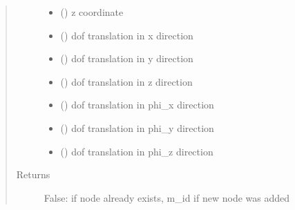 \documentclass[letterpaper,10pt,english]{sphinxmanual}
\begin{document}
\begin{fulllineitems}
\begin{fulllineitems}
\begin{quote}
\begin{description}
\begin{itemize}
\item {} 
 () \textendash{} z coordinate

\item {} 
 () \textendash{} dof translation in x direction

\item {} 
 () \textendash{} dof translation in y direction

\item {} 
 () \textendash{} dof translation in z direction

\item {} 
 () \textendash{} dof translation in phi\_x direction

\item {} 
 () \textendash{} dof translation in phi\_y direction

\item {} 
 () \textendash{} dof translation in phi\_z direction

\end{itemize}

\item[{Returns}] \leavevmode
False: if node already exists, m\_id if new node was added

\end{description}\end{quote}


\end{fulllineitems}
\end{fulllineitems}
\end{document}
